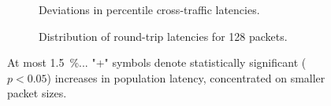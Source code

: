 \documentclass[sigconf,natbib=false]{acmart}
\begin{document}
\begin{figure}
	\centering
	\begin{subfigure}{0.45\linewidth}
		\caption{Deviations in  percentile cross-traffic latencies.\label{fig:dataplane-heat}}
	\end{subfigure}
	\hspace{0.05\linewidth}
		\begin{subfigure}{0.45\linewidth}
		\caption{Distribution of round-trip latencies for \SI{128}{\byte} packets.\label{fig:dataplane-example}}
	\end{subfigure}
	\caption{At most \SI{1.5}{\percent}... "+" symbols denote statistically significant ($p < 0.05$) increases in population latency, concentrated on smaller packet sizes.\label{fig:dataplane-coop}}
\end{figure}
\end{document}
